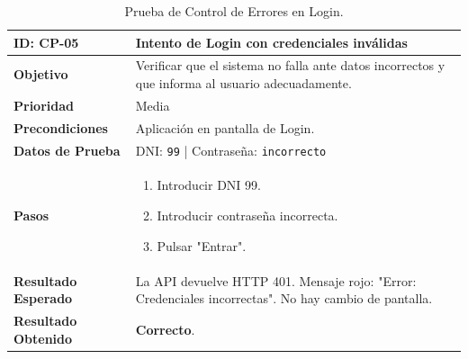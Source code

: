 \begin{table}[H]
    \centering
    \begin{tabularx}{\textwidth}{|l|X|}
        \hline
        \rowcolor{gray!25} \textbf{ID: CP-05} & \textbf{Intento de Login con credenciales inválidas} \\ \hline
        \textbf{Objetivo} & Verificar que el sistema no falla ante datos incorrectos y que informa al usuario adecuadamente. \\ \hline
        \textbf{Prioridad} & Media \\ \hline
        \textbf{Precondiciones} & Aplicación en pantalla de Login. \\ \hline
        \textbf{Datos de Prueba} & DNI: \texttt{99} | Contraseña: \texttt{incorrecto} \\ \hline
        \textbf{Pasos} & 
        \vspace*{-\baselineskip}
        \begin{enumerate}
            \item Introducir DNI 99.
            \item Introducir contraseña incorrecta.
            \item Pulsar "Entrar".
        \end{enumerate} \\ \hline
        \textbf{Resultado Esperado} & La API devuelve HTTP 401. Mensaje rojo: "Error: Credenciales incorrectas". No hay cambio de pantalla. \\ \hline
        \textbf{Resultado Obtenido} & \textcolor{green!40!black}{\textbf{Correcto}}. \\ \hline
    \end{tabularx}
    \caption{Prueba de Control de Errores en Login.}
\end{table}

